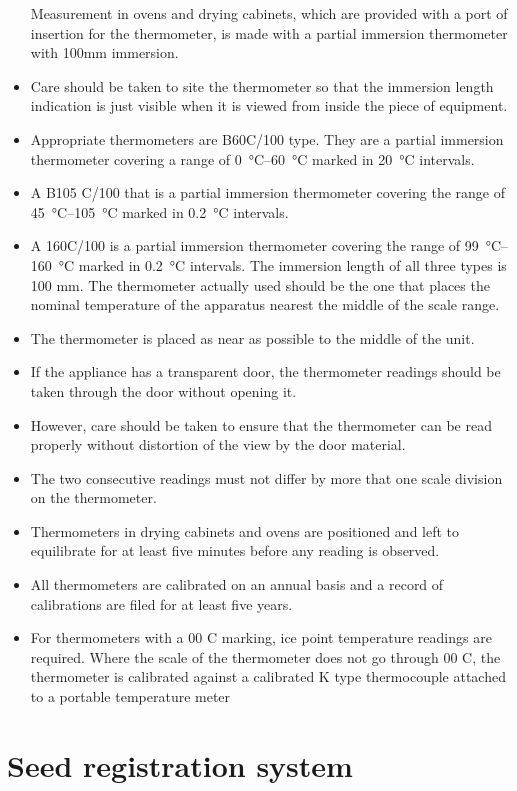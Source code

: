 \documentclass[]{book}
\begin{document}
\begin{itemize}
  Measurement in ovens and drying cabinets, which are provided with a
  port of insertion for the thermometer, is made with a partial
  immersion thermometer with 100mm immersion.
\item
  Care should be taken to site the thermometer so that the immersion
  length indication is just visible when it is viewed from inside the
  piece of equipment.
\item
  Appropriate thermometers are B60C/100 type. They are a partial
  immersion thermometer covering a range of \SIrange{0}{60}{\celsius}
  marked in \SI{20}{\celsius} intervals.
\item
  A B105 C/100 that is a partial immersion thermometer covering the
  range of \SIrange{45}{105}{\celsius} marked in \SI{0.2}{\celsius}
  intervals.
\item
  A 160C/100 is a partial immersion thermometer covering the range of
  \SIrange{99}{160}{\celsius} marked in \SI{0.2}{\celsius} intervals.
  The immersion length of all three types is 100 mm. The thermometer
  actually used should be the one that places the nominal temperature of
  the apparatus nearest the middle of the scale range.
\item
  The thermometer is placed as near as possible to the middle of the
  unit.
\item
  If the appliance has a transparent door, the thermometer readings
  should be taken through the door without opening it.
\item
  However, care should be taken to ensure that the thermometer can be
  read properly without distortion of the view by the door material.
\item
  The two consecutive readings must not differ by more that one scale
  division on the thermometer.
\item
  Thermometers in drying cabinets and ovens are positioned and left to
  equilibrate for at least five minutes before any reading is observed.
\item
  All thermometers are calibrated on an annual basis and a record of
  calibrations are filed for at least five years.
\item
  For thermometers with a 00 C marking, ice point temperature readings
  are required. Where the scale of the thermometer does not go through
  00 C, the thermometer is calibrated against a calibrated K type
  thermocouple attached to a portable temperature meter
\end{itemize}

\chapter{Seed registration system}\label{seed-registration-system}
\end{document}
